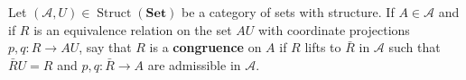 Let $(\mathcal{A}, U) \in \operatorname{Struct}(\mathbf{Set})$ be a category of sets with structure. If $A \in \mathcal{A}$ and if $R$ is an equivalence relation on the set $AU$ with coordinate projections $p, q: R \to AU$, say that $R$ is a \textbf{congruence} on $A$ if $R$ lifts to $\bar{R}$ in $\mathcal{A}$ such that $\bar{R}U = R$ and $p, q: \bar{R} \to A$ are admissible in $\mathcal{A}$.
